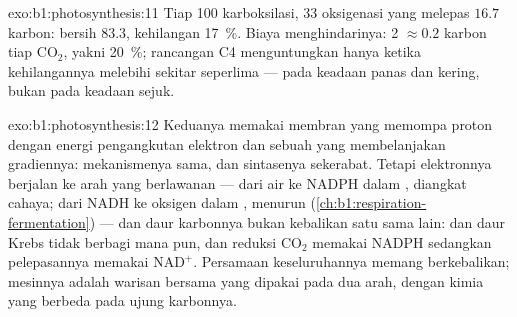 \begin{solution}{exo:b1:photosynthesis:11}
Tiap 100 karboksilasi, 33 oksigenasi yang melepas $16.7$ karbon: bersih
$83.3$, kehilangan \qty{17}{\%}. Biaya menghindarinya: 2  $\approx
0.2$ karbon tiap $\mathrm{CO_2}$, yakni \qty{20}{\%}; rancangan C4
menguntungkan hanya ketika kehilangannya melebihi sekitar seperlima ---
pada keadaan panas dan kering, bukan pada keadaan sejuk.
\end{solution}

\begin{solution}{exo:b1:photosynthesis:12}
Keduanya memakai membran yang memompa proton dengan energi pengangkutan
elektron dan sebuah  yang membelanjakan gradiennya:
mekanismenya sama, dan sintasenya sekerabat. Tetapi elektronnya
berjalan ke arah yang berlawanan --- dari air ke NADPH dalam
, diangkat cahaya; dari NADH ke oksigen dalam
, menurun
(\cref{ch:b1:respiration-fermentation}) --- dan daur karbonnya bukan
kebalikan satu sama lain:  dan daur Krebs tidak berbagi 
mana pun, dan reduksi $\mathrm{CO_2}$ memakai NADPH sedangkan
pelepasannya memakai $\mathrm{NAD^+}$. Persamaan keseluruhannya memang
berkebalikan; mesinnya adalah warisan bersama yang dipakai pada dua
arah, dengan kimia yang berbeda pada ujung karbonnya.
\end{solution}

